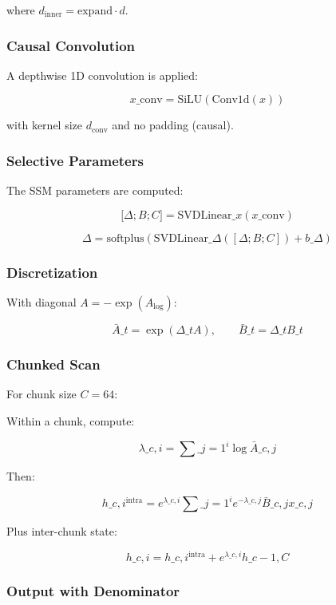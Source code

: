 where $d_\text{inner} = \text{expand} \cdot d$.

\subsubsection{Causal Convolution}

A depthwise 1D convolution is applied:

\[
x\_\text{conv} = \text{SiLU}(\text{Conv1d}(x))
\tag{4.8}
\]

with kernel size $d_\text{conv}$ and no padding (causal).

\subsubsection{Selective Parameters}

The SSM parameters are computed:

\[
{[}\Delta; B; C] = \text{SVDLinear}\_{x}(x\_\text{conv})
\tag{4.9}
\]

\[
\Delta = \text{softplus}(\text{SVDLinear}\_{\Delta}([\Delta; B; C]) + b\_\Delta)
\tag{4.10}
\]

\subsubsection{Discretization}

With diagonal $A = -\exp(A_\text{log})$:

\[
\bar{A}\_t = \exp(\Delta\_t A), \qquad
\bar{B}\_t = \Delta\_t B\_t
\tag{4.11}
\]

\subsubsection{Chunked Scan}

For chunk size $C = 64$:

Within a chunk, compute:

\[
\lambda\_{c, i} = \sum\_{j=1}^i \log \bar{A}\_{c, j}
\tag{4.12}
\]

Then:

\[
h\_{c, i}^\text{intra} = e^{\lambda\_{c, i}} \sum\_{j=1}^i e^{-\lambda\_{c, j}} \bar{B}\_{c, j} x\_{c, j}
\tag{4.13}
\]

Plus inter-chunk state:

\[
h\_{c, i} = h\_{c, i}^\text{intra} + e^{\lambda\_{c, i}} h\_{c-1, C}
\tag{4.14}
\]

\subsubsection{Output with Denominator}

